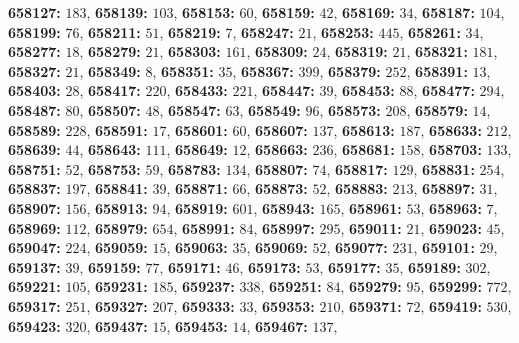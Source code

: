 \textsf{\bfseries 658127:} $183$, \textsf{\bfseries 658139:} $103$, \textsf{\bfseries 658153:} $60$, \textsf{\bfseries 658159:} $42$, \textsf{\bfseries 658169:} $34$, \textsf{\bfseries 658187:} $104$, \textsf{\bfseries 658199:} $76$, \textsf{\bfseries 658211:} $51$, \textsf{\bfseries 658219:} $7$, \textsf{\bfseries 658247:} $21$, \textsf{\bfseries 658253:} $445$, \textsf{\bfseries 658261:} $34$, \textsf{\bfseries 658277:} $18$, \textsf{\bfseries 658279:} $21$, \textsf{\bfseries 658303:} $161$, \textsf{\bfseries 658309:} $24$, \textsf{\bfseries 658319:} $21$, \textsf{\bfseries 658321:} $181$, \textsf{\bfseries 658327:} $21$, \textsf{\bfseries 658349:} $8$, \textsf{\bfseries 658351:} $35$, \textsf{\bfseries 658367:} $399$, \textsf{\bfseries 658379:} $252$, \textsf{\bfseries 658391:} $13$, \textsf{\bfseries 658403:} $28$, \textsf{\bfseries 658417:} $220$, \textsf{\bfseries 658433:} $221$, \textsf{\bfseries 658447:} $39$, \textsf{\bfseries 658453:} $88$, \textsf{\bfseries 658477:} $294$, \textsf{\bfseries 658487:} $80$, \textsf{\bfseries 658507:} $48$, \textsf{\bfseries 658547:} $63$, \textsf{\bfseries 658549:} $96$, \textsf{\bfseries 658573:} $208$, \textsf{\bfseries 658579:} $14$, \textsf{\bfseries 658589:} $228$, \textsf{\bfseries 658591:} $17$, \textsf{\bfseries 658601:} $60$, \textsf{\bfseries 658607:} $137$, \textsf{\bfseries 658613:} $187$, \textsf{\bfseries 658633:} $212$, \textsf{\bfseries 658639:} $44$, \textsf{\bfseries 658643:} $111$, \textsf{\bfseries 658649:} $12$, \textsf{\bfseries 658663:} $236$, \textsf{\bfseries 658681:} $158$, \textsf{\bfseries 658703:} $133$, \textsf{\bfseries 658751:} $52$, \textsf{\bfseries 658753:} $59$, \textsf{\bfseries 658783:} $134$, \textsf{\bfseries 658807:} $74$, \textsf{\bfseries 658817:} $129$, \textsf{\bfseries 658831:} $254$, \textsf{\bfseries 658837:} $197$, \textsf{\bfseries 658841:} $39$, \textsf{\bfseries 658871:} $66$, \textsf{\bfseries 658873:} $52$, \textsf{\bfseries 658883:} $213$, \textsf{\bfseries 658897:} $31$, \textsf{\bfseries 658907:} $156$, \textsf{\bfseries 658913:} $94$, \textsf{\bfseries 658919:} $601$, \textsf{\bfseries 658943:} $165$, \textsf{\bfseries 658961:} $53$, \textsf{\bfseries 658963:} $7$, \textsf{\bfseries 658969:} $112$, \textsf{\bfseries 658979:} $654$, \textsf{\bfseries 658991:} $84$, \textsf{\bfseries 658997:} $295$, \textsf{\bfseries 659011:} $21$, \textsf{\bfseries 659023:} $45$, \textsf{\bfseries 659047:} $224$, \textsf{\bfseries 659059:} $15$, \textsf{\bfseries 659063:} $35$, \textsf{\bfseries 659069:} $52$, \textsf{\bfseries 659077:} $231$, \textsf{\bfseries 659101:} $29$, \textsf{\bfseries 659137:} $39$, \textsf{\bfseries 659159:} $77$, \textsf{\bfseries 659171:} $46$, \textsf{\bfseries 659173:} $53$, \textsf{\bfseries 659177:} $35$, \textsf{\bfseries 659189:} $302$, \textsf{\bfseries 659221:} $105$, \textsf{\bfseries 659231:} $185$, \textsf{\bfseries 659237:} $338$, \textsf{\bfseries 659251:} $84$, \textsf{\bfseries 659279:} $95$, \textsf{\bfseries 659299:} $772$, \textsf{\bfseries 659317:} $251$, \textsf{\bfseries 659327:} $207$, \textsf{\bfseries 659333:} $33$, \textsf{\bfseries 659353:} $210$, \textsf{\bfseries 659371:} $72$, \textsf{\bfseries 659419:} $530$, \textsf{\bfseries 659423:} $320$, \textsf{\bfseries 659437:} $15$, \textsf{\bfseries 659453:} $14$, \textsf{\bfseries 659467:} $137$, 
